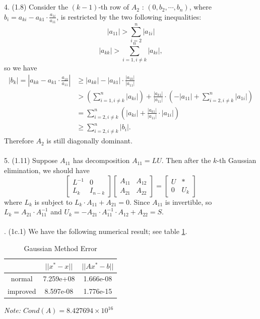 \documentclass[11pt]{article}
\begin{document}
\\\\
4. (1.8) Consider the $(k-1)$-th row of $A_2$ : $(0, b_2, \cdots, b_n)$, where $b_i=a_{ki}-a_{k1}\cdot \frac{a_{1i}}{a_{11}}$, is restricted by the two following inequalities:
$$ |a_{11}| > \sum_{i=2}^{n} |a_{1i}| $$
$$ |a_{kk}| > \sum_{i=1, i\neq k}^{n} |a_{ki}|,$$
so we have
\begin{align*}
|b_k| = |a_{kk} - a_{k1} \cdot \frac{a_{1k}}{a_{11}}|
& \ge |a_{kk}| - |a_{k1}| \cdot \frac{|a_{1k}|}{|a_{11}|} \\
& > \left( \sum_{i=1, i\neq k}^{n} |a_{ki}| \right) + \frac{|a_{k1}|}{|a_{11}|} \cdot \left( -|a_{11}| + \sum_{i=2, i\neq k}^{n} |a_{1i}| \right) \\
& = \sum_{i=2, i\neq k}^{n} \left( |a_{ki}| + \frac{|a_{k1}|}{|a_{11}|} \cdot |a_{1i}| \right) \\
& \ge \sum_{i=2, i\neq k}^{n} |b_i|.
\end{align*}
Therefore $A_2$ is still diagonally dominant.
\\\\
5. (1.11) Suppose $A_{11}$ has decomposition $A_{11} = LU$. Then after the $k$-th Gaussian elimination, we should have
$$\begin{bmatrix}L^{-1} & 0 \\ L_k & I_{n-k} \end{bmatrix} \begin{bmatrix}A_{11} & A_{12} \\ A_{21} & A_{22} \end{bmatrix} = \begin{bmatrix}U & * \\ 0 & U_k \end{bmatrix}$$
where $L_k$ is subject to $L_k \cdot A_{11} + A_{21} = 0$.
Since $A_{11}$ is invertible, so $L_k = A_{21} \cdot A_{11}^{-1}$ and $U_k = -A_{21}\cdot A_{11}^{-1}\cdot A_{12} + A_{22} = S$.
\\\\
. (1c.1) We have the following numerical result; see table \ref{tab:t_6}.
\begin{table}[ht]
	\caption{Gaussian Method Error}
	\label{tab:t_6}
	\centering
	\begin{tabular}{c|cc}
		\hline
		& $||x^*-x||$ & $||Ax^*-b||$ \\
		\hline
		normal   & 7.259e+08 & 1.666e-08 \\
		improved & 8.597e-08 & 1.776e-15 \\
		\hline
	\end{tabular}

	\emph{Note: $Cond(A)=8.427694\times 10^{16}$}
\end{table}
\end{document}
